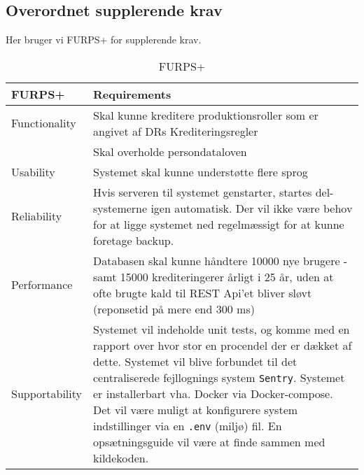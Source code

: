\subsection{Overordnet supplerende krav}

Her bruger vi FURPS+ for supplerende krav.
\begin{table}[h]
    \centering
    \begin{tabular}{|p{3cm}|p{13cm}|}
    \hline
    \textbf{FURPS+}           &    \textbf{Requirements} \\
    \hline
    Functionality           & Skal kunne kreditere produktionsroller som er angivet af DRs Krediteringsregler \\
                            & Skal overholde persondataloven \\
    \hline
    Usability       & Systemet skal kunne understøtte flere sprog \\
    \hline
    Reliability     &  Hvis serveren til systemet genstarter, startes del-systemerne igen automatisk. Der vil ikke være behov for at ligge systemet ned regelmæssigt for at kunne foretage backup. \\
    \hline
    Performance     &  Databasen skal kunne håndtere 10000 nye brugere - samt 15000 krediteringerer årligt i 25 år, uden at ofte brugte kald til REST Api'et bliver sløvt (reponsetid på mere end 300 ms) \\
    \hline
    Supportability  &  Systemet vil indeholde unit tests, og komme med en rapport over hvor stor en procendel der er dækket af dette. %
    Systemet vil blive forbundet til det centraliserede fejllognings system \texttt{Sentry}.
    Systemet er installerbart vha. Docker via Docker-compose. %
    Det vil være muligt at konfigurere system indstillinger via en \texttt{.env} (miljø) fil.
    En opsætningsguide vil være at finde sammen med kildekoden. 
    \\ \hline
    \end{tabular}
    \caption{FURPS+}
    \label{tab:furps}
\end{table}

